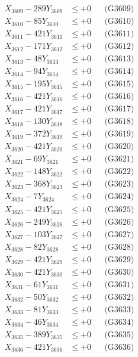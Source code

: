 \documentclass[a4paper,10pt]{article}
\begin{document}
{\begin{align}
X_{3609} - 289Y_{3609} &\leq +0 && \text{(G3609)} \\
X_{3610} - 85Y_{3610} &\leq +0 && \text{(G3610)} \\
\allowbreak
X_{3611} - 421Y_{3611} &\leq +0 && \text{(G3611)} \\
X_{3612} - 171Y_{3612} &\leq +0 && \text{(G3612)} \\
X_{3613} - 48Y_{3613} &\leq +0 && \text{(G3613)} \\
X_{3614} - 94Y_{3614} &\leq +0 && \text{(G3614)} \\
X_{3615} - 195Y_{3615} &\leq +0 && \text{(G3615)} \\
X_{3616} - 421Y_{3616} &\leq +0 && \text{(G3616)} \\
X_{3617} - 421Y_{3617} &\leq +0 && \text{(G3617)} \\
X_{3618} - 130Y_{3618} &\leq +0 && \text{(G3618)} \\
X_{3619} - 372Y_{3619} &\leq +0 && \text{(G3619)} \\
X_{3620} - 421Y_{3620} &\leq +0 && \text{(G3620)} \\
\allowbreak
X_{3621} - 69Y_{3621} &\leq +0 && \text{(G3621)} \\
X_{3622} - 148Y_{3622} &\leq +0 && \text{(G3622)} \\
X_{3623} - 368Y_{3623} &\leq +0 && \text{(G3623)} \\
X_{3624} - 7Y_{3624} &\leq +0 && \text{(G3624)} \\
X_{3625} - 421Y_{3625} &\leq +0 && \text{(G3625)} \\
X_{3626} - 249Y_{3626} &\leq +0 && \text{(G3626)} \\
X_{3627} - 103Y_{3627} &\leq +0 && \text{(G3627)} \\
X_{3628} - 82Y_{3628} &\leq +0 && \text{(G3628)} \\
X_{3629} - 421Y_{3629} &\leq +0 && \text{(G3629)} \\
X_{3630} - 421Y_{3630} &\leq +0 && \text{(G3630)} \\
\allowbreak
X_{3631} - 61Y_{3631} &\leq +0 && \text{(G3631)} \\
X_{3632} - 50Y_{3632} &\leq +0 && \text{(G3632)} \\
X_{3633} - 81Y_{3633} &\leq +0 && \text{(G3633)} \\
X_{3634} - 46Y_{3634} &\leq +0 && \text{(G3634)} \\
X_{3635} - 389Y_{3635} &\leq +0 && \text{(G3635)} \\
X_{3636} - 421Y_{3636} &\leq +0 && \text{(G3636)} \\

\end{align}}
\end{document}
